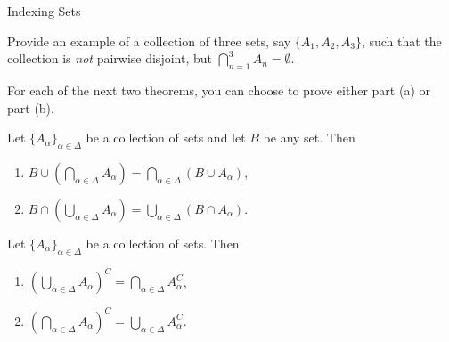 \begin{section}{Indexing Sets}
\begin{exercise}
Provide an example of a collection of three sets, say $\{A_1, A_2, A_3\}$, such that the collection is \emph{not} pairwise disjoint, but $\bigcap_{n=1}^3 A_n=\emptyset$.
\end{exercise}

For each of the next two theorems, you can choose to prove either part (a) or part (b).

\begin{theorem}
Let $\{A_{\alpha}\}_{\alpha\in\Delta}$ be a collection of sets and let $B$ be any set.  Then
\begin{multicols}{2}
\begin{enumerate}[label=\textrm{(\alph*)}]
\item $\displaystyle B \cup \left(\bigcap_{\alpha\in\Delta}A_{\alpha}\right)=\bigcap_{\alpha\in\Delta}(B\cup A_{\alpha})$,
\item $\displaystyle B \cap \left(\bigcup_{\alpha\in\Delta}A_{\alpha}\right)=\bigcup_{\alpha\in\Delta}(B\cap A_{\alpha})$.
\end{enumerate}
\end{multicols}
\end{theorem}

\begin{theorem}
Let $\{A_{\alpha}\}_{\alpha\in\Delta}$ be a collection of sets.  Then
\begin{multicols}{2}
\begin{enumerate}[label=\textrm{(\alph*)}]
\item $\displaystyle \left(\bigcup_{\alpha\in\Delta} A_{\alpha}\right)^C=\bigcap_{\alpha\in\Delta}A_{\alpha}^{C}$,
\item $\displaystyle \left(\bigcap_{\alpha\in\Delta} A_{\alpha}\right)^C=\bigcup_{\alpha\in\Delta}A_{\alpha}^{C}$.
\end{enumerate}
\end{multicols}
\end{theorem}

\end{section}